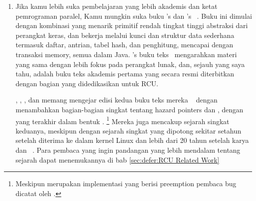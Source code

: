 \begin{enumerate}
\item 	Jika kamu lebih suka pembelajaran yang lebih akademis dan ketat
	pemrograman paralel, Kamu mungkin suka buku 's
	dan 's ~\cite{HerlihyShavit2008Textbook,HerlihyShavit2020Textbook}.
	Buku ini dimulai dengan kombinasi yang menarik
	primitif rendah tingkat tinggi abstraksi
	dari perangkat keras, dan bekerja melalui kunci
	dan struktur data sederhana termasuk daftar, antrian,
	tabel hash, dan penghitung, mencapai dengan transaksi
	memory, semua dalam Java.
	's buku teks~\cite{MichaelScott2013Textbook}
	mengarahkan materi yang sama dengan lebih fokus pada
	perangkat lunak, dan, sejauh yang saya tahu, adalah
	buku teks akademis pertama yang secara resmi diterbitkan dengan
	bagian yang didedikasikan untuk RCU\@.

	, ,
	, dan  memang
	mengejar edisi kedua buku teks mereka ~\cite{HerlihyShavit2020Textbook}
	dengan menambahkan bagian-bagian singkat tentang hazard pointers
	dan , dengan yang terakhir dalam bentuk  \@.
	\footnote{
		Meskipun merupakan implementasi yang berisi preemption pembaca
			bug dicatat oleh .}
	Mereka juga mencakup sejarah singkat keduanya, meskipun dengan
	sejarah singkat  yang dipotong sekitar setahun setelah
	 diterima ke dalam kernel Linux dan lebih dari 20 tahun
	setelah karya  dan 
	~\cite{Kung80}.
	Para pembaca yang ingin pandangan yang lebih mendalam tentang
	sejarah dapat menemukannya di bab \cref{sec:defer:RCU Related Work}


\end{enumerate}
